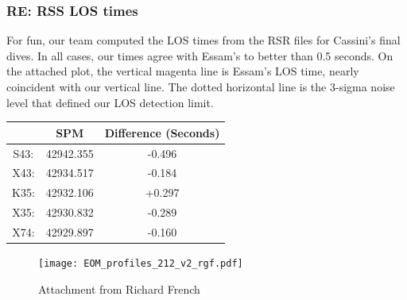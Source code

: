 \documentclass[crop=false,class=article,oneside]{standalone}
\begin{document}
\subsubsection{\footnotesize RE: RSS LOS times}
For fun, our team computed the LOS times from the RSR files for Cassini's final dives. In all cases, our times agree with Essam's to better than 0.5 seconds. On the attached plot, the vertical magenta line is Essam's LOS time, nearly coincident with our vertical line. The dotted horizontal line is the 3-sigma noise level that defined our LOS detection limit.
\begin{table}[H]
    \centering
    \begin{tabular}{c c c} 
        \hline
        & SPM      & Difference (Seconds)    \\ 
        \hline
        S43: & 42942.355 & -0.496    \\
        X43: & 42934.517 & -0.184    \\
        K35: & 42932.106 & +0.297    \\
        X35: & 42930.832 & -0.289    \\
        X74: & 42929.897 & -0.160    \\
        \hline
    \end{tabular}
\end{table}
\begin{figure}[H]
    \centering
    \captionsetup{type=figure}
    \texttt{[image: EOM\_profiles\_212\_v2\_rgf.pdf]}
    \caption{Attachment from Richard French}
\end{figure}
\end{document}
